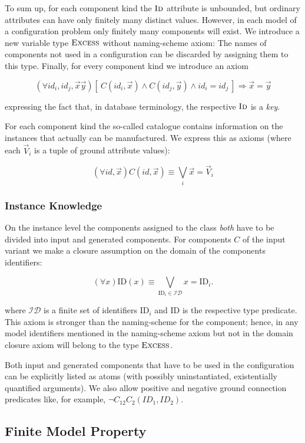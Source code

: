 \documentclass[copyright,creativecommons]{eptcs}
\newcommand{\sort}[1]{\ensuremath{\text{\sc #1}}\xspace}
\begin{document}
To sum up, for each component kind the \sort{Id} attribute is unbounded, but ordinary attributes can have only finitely many distinct values.
However, in each model of a configuration problem only finitely many components will exist. We introduce a new variable type \sort{Excess} without naming-scheme axiom\/:
The names of components not used in a configuration can be discarded by assigning them to this type.
Finally, for every component kind we introduce an axiom

\[
(\forall id_i,id_j,\vec x \vec y)[\ C(id_i,\vec x) \land C(id_j,\vec y) \land id_i = id_j\ ] \Rightarrow \vec x = \vec y
\]

expressing the fact that, in database terminology, the respective \sort{Id} is a {\em key}.

For each component kind the so-called catalogue contains information on the instances that actually can be manufactured.
We express this as axioms (where each $\vec V_i$ is a tuple of ground attribute values)\/:

\[
(\forall id,\vec x) C(id,\vec x) \equiv \bigvee_i \vec x = \vec V_i
\]

\subsubsection{Instance Knowledge}
On the instance level the components assigned to the class {\em both} have to be divided into input and generated components.
For components $C$ of the input variant we make a closure assumption on the domain of the components identifiers\/:

\[
(\forall x) \text{ID}(x) \equiv \bigvee_{\text{ID}_i \in \mathcal{ID}} x = \text{ID}_i.
\]

where $\mathcal{ID}$ is a finite set of identifiers $\text{ID}_i$ and $\text{ID}$ is the respective type predicate.
This axiom is stronger than the naming-scheme for the component;
hence, in any model identifiers mentioned in the naming-scheme axiom but not in the domain closure axiom will belong to the type \sort{Excess}.

Both input and generated components that have to be used in the configuration can be explicitly listed as atoms (with possibly uninstantiated, existentially quantified arguments).
We also allow positive and negative ground connection predicates like, for example, $\neg C_12C_2(ID_1,ID_2)$.

\subsection{Finite Model Property}
\end{document}
